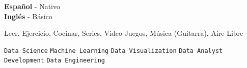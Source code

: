 \documentclass[9pt]{developercv} %
\begin{document}

\begin{minipage}[t]{0.3\textwidth}
	\vspace{-\baselineskip} %

	
	\textbf{Español} - Nativo\\
	\textbf{Inglés} - Básico\\
\end{minipage}
\hfill
\begin{minipage}[t]{0.3\textwidth}
	\vspace{-\baselineskip} %
	
	
	 Leer, Ejercicio, Cocinar, Series, Video Juegos, Música (Guitarra), Aire Libre
\end{minipage}
\hfill
\begin{minipage}[t]{0.3\textwidth}
	\vspace{-\baselineskip} %
	
	
	\texttt{Data Science}\slashsep
	\texttt{Machine Learning}\slashsep
	\texttt{Data Visualization}\slashsep
	\texttt{Data Analyst}\slashsep
	\texttt{Development}\slashsep
	\texttt{Data Engineering}\slashsep
\end{minipage}

\end{document}
